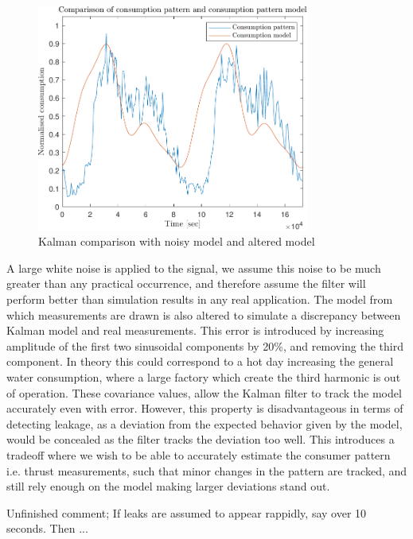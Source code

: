 \begin{figure}[h!]
	\centering
	\includegraphics[width=0.8\textwidth]{Pictures/Comparisson.pdf}
	
	\caption{Kalman comparison with noisy model and altered model}
	\label{fig:Comparison}
\end{figure}

A large white noise is applied to the signal, we assume this noise to be much greater than any practical occurrence, and therefore assume the filter will perform better than simulation results in any real application. The model from which measurements are drawn is also altered to simulate a discrepancy between Kalman model and real measurements. This error is introduced by increasing amplitude of the first two sinusoidal components by 20\%, and removing the third component. In theory this could correspond to a hot day increasing the general water consumption, where a large factory which create the third harmonic is out of operation.
These covariance values, allow the Kalman filter to track the model accurately even with error. However, this property is disadvantageous in terms of detecting leakage, as a deviation from the expected behavior given by the model, would be concealed as the filter tracks the deviation too well. This introduces a tradeoff where we wish to be able to accurately estimate the consumer pattern i.e. thrust measurements, such that minor changes in the pattern are tracked, and still rely enough on the model making larger deviations stand out.

Unfinished comment; If leaks are assumed to appear rappidly, say over 10 seconds. Then ...